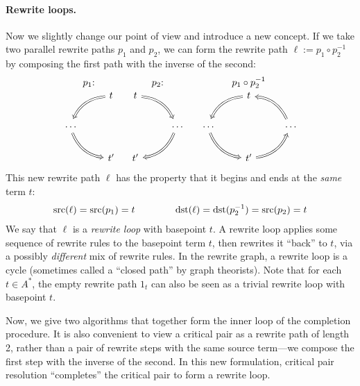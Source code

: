 \documentclass[../generics]{subfiles}
\begin{document}
\paragraph{Rewrite loops.}
Now we slightly change our point of view and introduce a new concept. If we take two parallel rewrite paths $p_1$ and $p_2$, we can form the rewrite path $\ell:=p_1\circ p_2^{-1}$ by composing the first path with the inverse of the second:
\[
\begin{array}{ccc}
\text{$p_1$:}&\text{$p_2$:}&\text{$p_1\circ p_2^{-1}$}\\
\begin{tikzcd}
&t\arrow[ld, Rightarrow, bend right]\\
\vphantom{P}\cdots\arrow[rd, Rightarrow, bend right]\\
&t^\prime
\end{tikzcd}&
\begin{tikzcd}
t\arrow[rd, Rightarrow, bend left]\\
&\vphantom{P}\cdots\arrow[ld, Rightarrow, bend left]\\
t^\prime
\end{tikzcd}&
\begin{tikzcd}
&t\arrow[ld, Rightarrow, bend right]\\
\vphantom{P}\cdots\arrow[rd, Rightarrow, bend right]&&\vphantom{P}\cdots\arrow[lu, Rightarrow, bend right]\\
&t^\prime\arrow[ru, Rightarrow, bend right]
\end{tikzcd}
\end{array}
\]
This new rewrite path $\ell$ has the property that it begins and ends at the \emph{same} term $t$:
\begin{gather*}
\operatorname{src}(\ell)=\operatorname{src}(p_1)=t\qquad\qquad\operatorname{dst}(\ell)=\operatorname{dst}(p_2^{-1})=\operatorname{src}(p_2)=t
\end{gather*}
We say that $\ell$ is a \emph{rewrite loop} with basepoint $t$. A rewrite loop applies some sequence of rewrite rules to the basepoint term $t$, then rewrites it ``back'' to $t$, via a possibly \emph{different} mix of rewrite rules. In the rewrite graph, a rewrite loop is a cycle (sometimes called a ``closed path'' by graph theorists). Note that for each $t\in A^*$, the empty rewrite path $1_t$ can also be seen as a trivial rewrite loop with basepoint $t$.

Now, we give two algorithms that together form the inner loop of the completion procedure. It is also convenient to view a critical pair as a rewrite path of length 2, rather than a pair of rewrite steps with the same source term---we compose the first step with the inverse of the second. In this new formulation, critical pair resolution ``completes'' the critical pair to form a rewrite loop.
\end{document}

